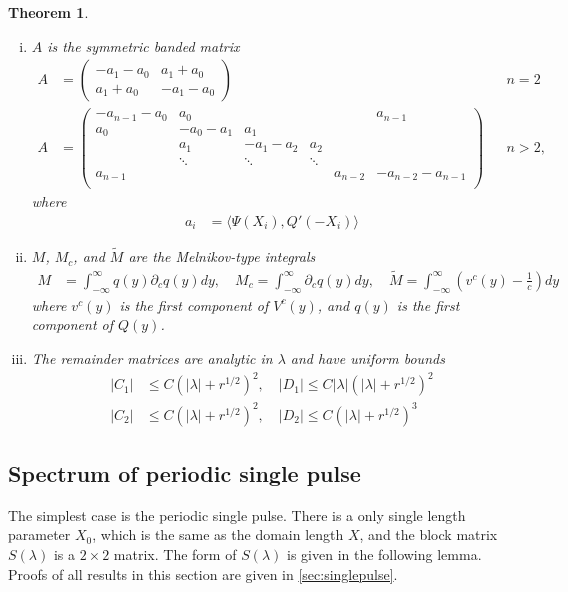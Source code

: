 \documentclass[10pt,reqno]{amsart}
\theoremstyle{plain}
\newtheorem{theorem}{Theorem}
\theoremstyle{definition}
\theoremstyle{remark}
\numberwithin{theorem}{section}
\numberwithin{equation}{section}
\begin{document}
\begin{theorem}
\begin{enumerate}[(i)]
\item $A$ is the symmetric banded matrix
\begin{align}\label{Asymm}
A &= \begin{pmatrix}
-a_1 - a_0 & a_1 + a_0 \\
a_1 + a_0 & - a_1 - a_0 
\end{pmatrix} && n = 2 \\
A &= \begin{pmatrix}
-a_{n-1} - a_0 & a_0 & & &  & a_{n-1}\\
a_0 & -a_0 - a_1 &  a_1 \\
& a_1 & -a_1 - a_2 &  a_2 \\
& \ddots & \ddots & \ddots \\
a_{n-1} & & & & a_{n-2} & -a_{n-2} - a_{n-1} \\
\end{pmatrix} && n > 2,
\end{align}
where
\begin{align*}
a_i &= \langle \Psi(X_i), Q'(-X_i) \rangle
\end{align*}

\item $M$, $M_c$, and $\tilde{M}$ are the Melnikov-type integrals
\begin{align*}
M &= \int_{-\infty}^\infty q(y) \partial_c q(y) dy, \quad
M_c = \int_{-\infty}^\infty \partial_c q(y) dy, \quad
\tilde{M} = \int_{-\infty}^{\infty} \left(v^c(y) - \frac{1}{c}\right) dy
\end{align*}
where $v^c(y)$ is the first component of $V^c(y)$, and $q(y)$ is the first component of $Q(y)$.

\item The remainder matrices are analytic in $\lambda$ and have uniform bounds
\begin{align*}
|C_1| &\leq C (|\lambda| + r^{1/2})^2, \quad
|D_1| \leq C |\lambda|(|\lambda| + r^{1/2})^2 \\
|C_2| &\leq C (|\lambda| + r^{1/2})^2, \quad
|D_2| \leq C (|\lambda| + r^{1/2})^3 
\end{align*}
\end{enumerate}
\end{theorem}

\subsection{Spectrum of periodic single pulse}\label{sec:persingle}

The simplest case is the periodic single pulse. There is a only single length parameter $X_0$, which is the same as the domain length $X$, and the block matrix $S(\lambda)$ is a $2\times 2$ matrix. The form of $S(\lambda)$ is given in the following lemma. Proofs of all results in this section are given in \cref{sec:singlepulse}. 
\end{document}
